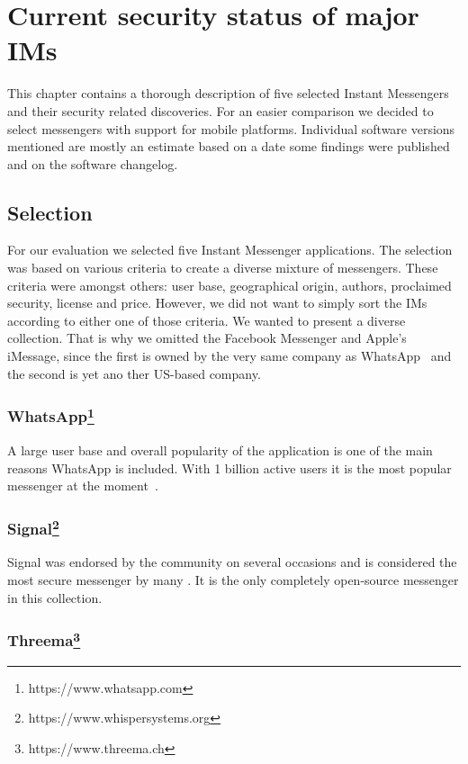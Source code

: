 \documentclass[thesis=M,english]{FITthesis}[2012/10/20]
\begin{document}
\chapter{Current security status of major IMs}\label{compar}

This chapter contains a thorough description of five selected Instant Messengers and their security related discoveries. For an easier comparison we decided to select messengers with support for mobile platforms. Individual software versions mentioned are mostly an estimate based on a date some findings were published and on the software changelog.

\section{Selection}

For our evaluation we selected five Instant Messenger applications. The selection was based on various criteria to create a diverse mixture of messengers. These criteria were amongst others: user base, geographical origin, authors, proclaimed security, license and price. However, we did not want to simply sort the IMs according to either one of those criteria. We wanted to present a diverse collection. That is why we omitted the Facebook Messenger and Apple's iMessage, since the first is owned by the very same company as WhatsApp~\cite{facebookwhatsappbuy} and the second is yet ano ther US-based company.


\subsection{WhatsApp\protect\footnote{https://www.whatsapp.com}}

A large user base and overall popularity of the application is one of the main reasons WhatsApp is included. With 1 billion active users it is the most popular messenger at the moment~\cite{whatsappusers}.

\subsection{Signal\protect\footnote{https://www.whispersystems.org}}

Signal was endorsed by the community on several occasions and is considered the most secure messenger by many \cite{signal-recommend}. It is the only completely open-source messenger in this collection.

\subsection{Threema\protect\footnote{https://www.threema.ch}}
\end{document}
